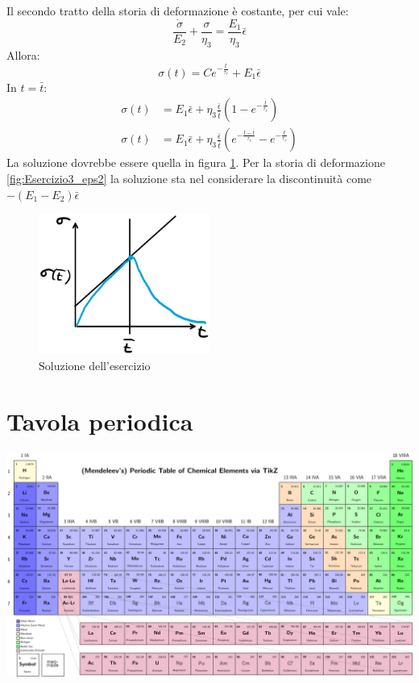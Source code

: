 Il secondo tratto della storia di deformazione è costante, per cui vale:
\begin{equation}
\frac{\dot{\sigma}}{E_2} + \frac{\sigma}{\eta_3} = \frac{E_1}{\eta_3}\bar{\epsilon}
\end{equation}
Allora:
\begin{equation}
\sigma(t) = C e^{-\frac{t}{\tau_r}} + E_1\bar{\epsilon}
\end{equation}
In $t = \bar{t}$:
\begin{equation}
\begin{split}
\sigma(t) &= E_1\bar{\epsilon} + \eta_3\frac{\bar{\epsilon}}{\bar{t}}\left(1 - e^{-\frac{\bar{t}}{\tau_r}}\right)\\
\sigma(t) &= E_1\bar{\epsilon} + \eta_3\frac{\bar{\epsilon}}{\bar{t}}\left(e^{-\frac{t-\bar{t}}{\tau_r}} - e^{-\frac{t}{\tau_r}}\right)
\end{split}
\end{equation}
La soluzione dovrebbe essere quella in figura \ref{fig:Soluzione3}.
Per la storia di deformazione \ref{fig:Esercizio3_eps2}
la soluzione sta nel considerare la discontinuità come $-(E_1 - E_2)\bar{\epsilon}$

\begin{figure}
\centering
\includegraphics[width = 0.5\textwidth]{gfx/Soluzione3}
\caption{Soluzione dell'esercizio}
\label{fig:Soluzione3}
\end{figure}
\chapter{Tavola periodica}\label{chp:Tavolaperiodica}
\newpage
\includegraphics[scale = 1, angle = 90]{gfx/Periodic_table2017}